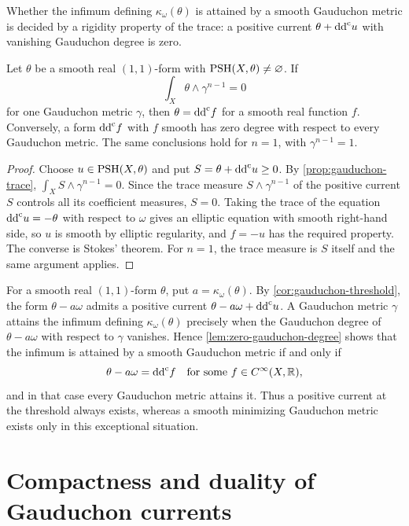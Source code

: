 Whether the infimum defining $\kappa_\omega(\theta)$ is attained by a smooth Gauduchon metric is decided by a rigidity property of the trace: a positive current $\theta+\mathrm{dd}^{\mathrm{c}} u$ with vanishing Gauduchon degree is zero.

\begin{lemma}\label{lem:zero-gauduchon-degree}
Let $\theta$ be a smooth real $(1,1)$-form with $\mathrm{PSH}(X,\theta)\ne\varnothing$. If
\[
 \int_X\theta\wedge\gamma^{n-1}=0
\]
for one Gauduchon metric $\gamma$, then $\theta=\mathrm{dd}^{\mathrm{c}} f$ for a smooth real function $f$. Conversely, a form $\mathrm{dd}^{\mathrm{c}} f$ with $f$ smooth has zero degree with respect to every Gauduchon metric. The same conclusions hold for $n=1$, with $\gamma^{n-1}=1$.
\end{lemma}
\begin{proof}
Choose $u\in\mathrm{PSH}(X,\theta)$ and put $S=\theta+\mathrm{dd}^{\mathrm{c}} u\geq0$. By \cref{prop:gauduchon-trace}, $\int_XS\wedge\gamma^{n-1}=0$. Since the trace measure $S\wedge\gamma^{n-1}$ of the positive current $S$ controls all its coefficient measures, $S=0$. Taking the trace of the equation $\mathrm{dd}^{\mathrm{c}} u=-\theta$ with respect to $\omega$ gives an elliptic equation with smooth right-hand side, so $u$ is smooth by elliptic regularity, and $f=-u$ has the required property. The converse is Stokes' theorem. For $n=1$, the trace measure is $S$ itself and the same argument applies.
\end{proof}

For a smooth real $(1,1)$-form $\theta$, put $a=\kappa_\omega(\theta)$. By \cref{cor:gauduchon-threshold}, the form $\theta-a\omega$ admits a positive current $\theta-a\omega+\mathrm{dd}^{\mathrm{c}} u$. A Gauduchon metric $\gamma$ attains the infimum defining $\kappa_\omega(\theta)$ precisely when the Gauduchon degree of $\theta-a\omega$ with respect to $\gamma$ vanishes. Hence \cref{lem:zero-gauduchon-degree} shows that the infimum is attained by a smooth Gauduchon metric if and only if
\[
 \theta-a\omega=\mathrm{dd}^{\mathrm{c}} f\quad\text{for some }f\in C^\infty(X,\mathbb R),
\]
and in that case every Gauduchon metric attains it. Thus a positive current at the threshold always exists, whereas a smooth minimizing Gauduchon metric exists only in this exceptional situation.

\section{Compactness and duality of Gauduchon currents}
\label{sec:gauduchon-linear-duality}

